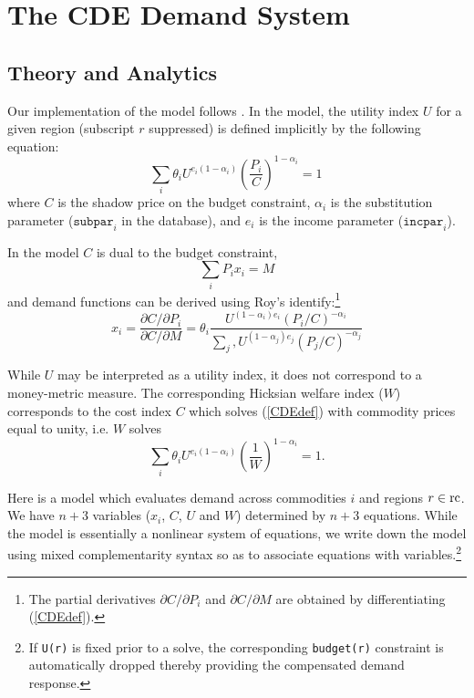 \section[D]{The CDE Demand System}\label{CDE}
\subsection*{Theory and Analytics}

Our implementation of the \CDE model follows \cite{Chen}. 
In the \CDE model, the utility index $U$ for a given region (subscript
$r$ suppressed) is defined implicitly by the
following equation:
\begin{equation}
\label{CDEdef}
\sum_i \theta_i U^{e_i (1-\alpha_i)} \left(\frac{P_i}{C}
\right)^{1-\alpha_{i}} = 1\,
\end{equation}
where $C$ is the shadow price on the budget constraint, $\alpha_{i}$ is the substitution
parameter ($\texttt{subpar}_{i}$ in the \GTAP database), and
$e_{i}$ is the income parameter ($\texttt{incpar}_{i}$).

In the \CDE model $C$ is dual to the budget constraint,
$$\sum_i P_{i} x_{i} = M$$
and demand functions can be derived using Roy's identify:\footnote{The
partial derivatives $\partial C/\partial P_i$ and $\partial C / \partial M$
are obtained by differentiating (\ref{CDEdef}).}
$$x_{i} = \frac{\partial C / \partial P_i}{\partial C / \partial M} =
        \theta_i \frac{ U^{(1-\alpha_i) e_i} (P_i / C)^{-\alpha_i} }
                {\sum_j, U^{(1-\alpha_j)e_j} (P_j/C)^{-\alpha_j}}$$

While $U$ may be interpreted as a utility index, it does not
correspond to a money-metric measure.  The corresponding Hicksian
welfare index ($W$) corresponds to the cost index $C$ which solves
(\ref{CDEdef}) with commodity prices equal to unity, i.e. $W$
solves
\begin{equation}
\label{Wdef}
\sum_i \theta_i U^{e_i (1-\alpha_i)} \left(\frac{1}{W}
\right)^{1-\alpha_{i}} = 1.
\end{equation}

Here is a \GAMS model which evaluates \CDE demand across commodities $i$
and regions $r \in \rm{rc}$.  We have $n+3$ variables ($x_i$, $C$,
$U$  and $W$) determined by $n+3$ equations.  While the \CDE model is
essentially a nonlinear system of equations, we write down the model
using mixed complementarity syntax so as to associate equations with
variables.\footnote{If \texttt{U(r)} is fixed prior to a \CDE solve, the
corresponding \texttt{budget(r)} constraint is automatically dropped
thereby providing the compensated demand response.}


